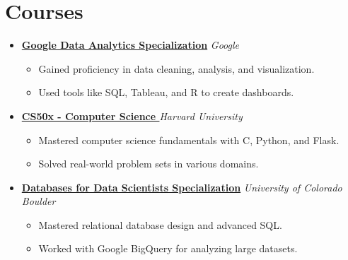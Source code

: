 \documentclass[letterpaper,11pt]{article}
\begin{document}
\section*{Courses}
\begin{itemize}[leftmargin=0.15in]
  \item \textbf{\href{https://www.coursera.org/account/accomplishments/specialization/AS9JOBALFZSL}{Google Data Analytics Specialization}} \hfill \textit{Google}\\
  \begin{itemize}[leftmargin=0.2in]
    \item Gained proficiency in data cleaning, analysis, and visualization.
    \item Used tools like SQL, Tableau, and R to create dashboards.
  \end{itemize}

  \item \textbf{\href{https://certificates.cs50.io/fe4b0a5a-c586-4a15-91ec-6b8a65f829e4.pdf?size=letter}{CS50x - Computer Science }} \hfill \textit{Harvard University}\\
  \begin{itemize}[leftmargin=0.2in]
    \item Mastered computer science fundamentals with C, Python, and Flask.
    \item Solved real-world problem sets in various domains.
  \end{itemize}

  \item \textbf{\href{https://www.coursera.org/account/accomplishments/specialization/GIPG5MXXA0FZ}{Databases for Data Scientists Specialization}} \hfill \textit{University of Colorado Boulder}\\
  \begin{itemize}[leftmargin=0.2in]
    \item Mastered relational database design and advanced SQL.
    \item Worked with Google BigQuery for analyzing large datasets.
  \end{itemize}
\end{itemize}


\end{document}
